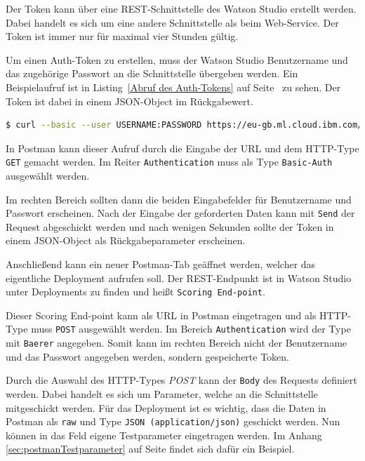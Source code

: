 Der Token kann über eine REST-Schnittstelle des Watson Studio erstellt werden. Dabei handelt es sich um eine andere
Schnittstelle als beim Web-Service. Der Token ist immer nur für maximal vier Stunden gültig.

Um einen Auth-Token zu erstellen, muss der Watson Studio Benutzername und das zugehörige Passwort an die Schnittstelle
übergeben werden. Ein Beispielaufruf ist in Listing~\ref{Abruf des Auth-Tokens} auf Seite~\pageref{Abruf des Auth-Tokens}
zu sehen. Der Token ist dabei in einem JSON-Object im Rückgabewert.

\begin{lstlisting}[language=bash, caption=Abruf des Auth-Tokens, label=Abruf des Auth-Tokens]
$ curl --basic --user USERNAME:PASSWORD https://eu-gb.ml.cloud.ibm.com/v3/identity/token
\end{lstlisting}

In Postman kann dieser Aufruf durch die Eingabe der URL und dem HTTP-Type \texttt{GET} gemacht werden. Im Reiter
\texttt{Authentication} muss als Type \texttt{Basic-Auth} ausgewählt werden.

Im rechten Bereich sollten dann die beiden Eingabefelder für Benutzername und Passwort erscheinen. Nach der Eingabe der
geforderten Daten kann mit \texttt{Send} der Request abgeschickt werden und nach wenigen Sekunden sollte der Token in
einem JSON-Object als Rückgabeparameter erscheinen.

Anschließend kann ein neuer Postman-Tab geäffnet werden, welcher das eigentliche Deployment aufrufen soll. Der
REST-Endpunkt ist in Watson Studio unter Deployments zu finden und heißt \texttt{Scoring End-point}.

Dieser Scoring End-point kann als URL in Postman eingetragen und als HTTP-Type muss \texttt{POST} ausgewählt werden. Im
Bereich \texttt{Authentication} wird der Type mit \texttt{Baerer} angegeben. Somit kann im rechten Bereich nicht der
Benutzername und das Passwort angegeben werden, sondern gespeicherte Token.

Durch die Auswahl des HTTP-Types \textit{POST} kann der \texttt{Body} des Requests definiert werden. Dabei handelt es
sich um Parameter, welche an die Schnittstelle mitgeschickt werden. Für das Deployment ist es wichtig, dass die Daten
in Postman als \texttt{raw} und Type \texttt{JSON (application/json)} geschickt werden. Nun können in das Feld eigene
Testparameter eingetragen werden. Im Anhang \ref{sec:postmanTestparameter} auf Seite \pageref{sec:postmanTestparameter}
findet sich dafür ein Beispiel.

